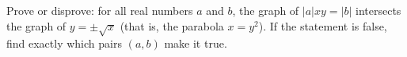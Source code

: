 Prove or disprove: for all real numbers $a$ and $b$, the graph of $|a|xy=|b|$ intersects the graph of $y=\pm\sqrt x$ (that is, the parabola $x=y^2$). If the statement is false, find exactly which pairs $(a,b)$ make it true.
